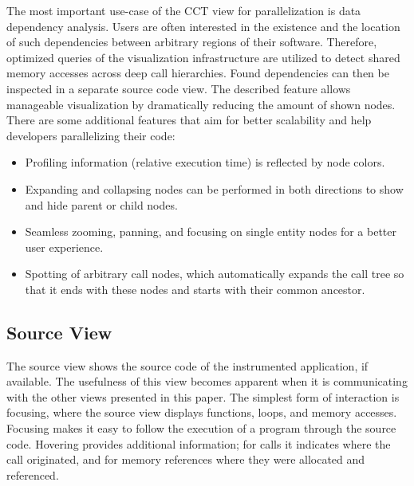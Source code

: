 The most important use-case of the CCT view for parallelization is data
dependency analysis. Users are often interested in the existence and the
location of such dependencies between arbitrary regions of their software.
Therefore, optimized queries of the visualization infrastructure are utilized
to detect shared memory accesses across deep call hierarchies. Found
dependencies can then be inspected in a separate source code view. The
described feature allows manageable visualization by dramatically reducing the
amount of shown nodes. There are some additional features that aim for better
scalability and help developers parallelizing their code:

\begin{itemize}
	\item Profiling information (relative execution time) is reflected by node
colors.
	\item Expanding and collapsing nodes can be performed in both
directions to show and hide parent or child nodes.
	\item Seamless zooming, panning, and focusing on single entity nodes for a
better user experience.
	\item Spotting of arbitrary call nodes, which automatically expands the call
tree so that it ends with these nodes and starts with their common ancestor.
\end{itemize}

\subsection{Source View}
The source view shows the source code of the instrumented application, if
available. The usefulness of this view becomes apparent when it is
communicating with the other views presented in this paper. The simplest form
of interaction is focusing, where the source view displays functions, loops,
and memory accesses. Focusing makes it easy to follow the execution of a
program through the source code. Hovering provides additional information; for
calls it indicates where the call originated, and for memory references where
they were allocated and referenced.
